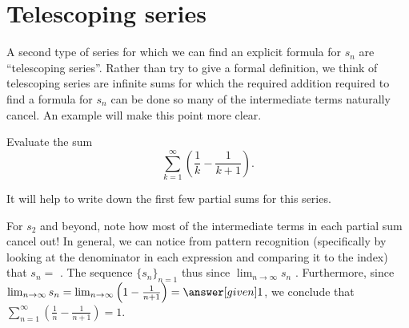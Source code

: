 \documentclass{ximera}
\begin{document}
\section{Telescoping series}

A second type of series for which we can find an explicit formula for $s_n$ are ``telescoping series''.  Rather than try to give a formal definition, we think of telescoping series are infinite sums for which the required addition required to find a formula for $s_n$ can be done so many of the intermediate terms naturally cancel.  An example will make this point more clear.

\begin{example}
  Evaluate the sum
  \[
  \sum_{k=1}^\infty\left(\frac{1}{k}-\frac{1}{k+1}\right).
  \]
  \begin{explanation}
It will help to write down the first few partial sums for this series.
\begin{image}
\end{image}
For $s_2$ and beyond, note how most of the intermediate terms in each partial sum cancel out! In
general, we can notice from pattern recognition (specifically by looking at the denominator in each expression and comparing it to the index) that $s_n =$ . The sequence $\{s_n\}_{n=1}$ thus  since $\lim_{n \to \infty} s_n$ . Furthermore, since $\lim_{n\to\infty}s_n = \lim_{n\to\infty}\left(1-\frac1{n+1}\right) = \answer[given]1$, we conclude
that $\sum_{n=1}^\infty \left(\frac1n-\frac1{n+1}\right) = 1$.
  \end{explanation}
\end{example}
\end{document}
